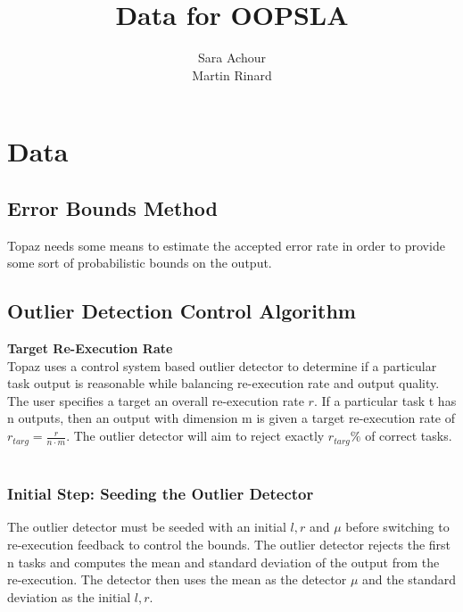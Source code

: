 \documentclass[11pt]{article}
\title{\textbf{Data for OOPSLA}}
\author{Sara Achour\\Martin Rinard}
\date{}
\begin{document}
\maketitle


\section{Data}
\subsection {}
\subsection {Error Bounds Method}
Topaz needs some means to estimate the accepted error rate in order to provide some sort of probabilistic bounds on the output. 

\subsection{Outlier Detection Control Algorithm}
\label{sec:outlierdetectionimpl}
\textbf{Target Re-Execution Rate}\\
Topaz uses a control system based outlier detector to determine if a particular task output is reasonable while balancing re-execution rate and output quality. The user specifies a target an overall re-execution rate $r$. If a particular task t has n outputs, then an output with dimension m is given a target re-execution rate of $r_{targ}=\frac {r} {n \cdot m}$. The outlier detector will aim to reject exactly $r_{targ}\%$ of correct tasks.\\\\
\subsubsection {Initial Step: Seeding the Outlier Detector}
The outlier detector must be seeded with an initial $l,r$ and $\mu$ before switching to re-execution feedback to control the bounds. The outlier detector rejects the first n tasks and computes the mean and standard deviation of the output from the re-execution. The detector then uses the mean as the detector $\mu$ and the standard deviation as the initial $l,r$.\\
\end{document}
